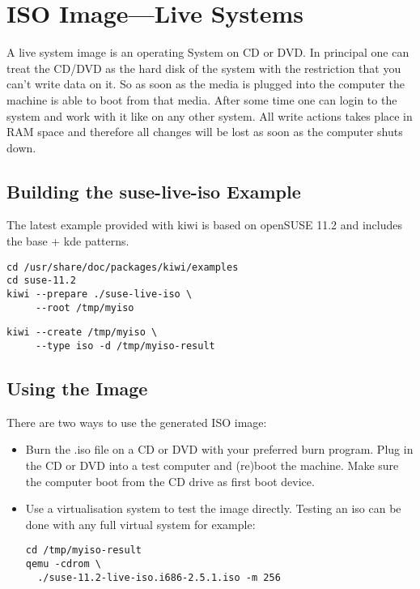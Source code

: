 \chapter{ISO Image---Live Systems}
\label{chapter:iso}
\minitoc

A live system image is an operating System on CD or DVD. In principal
one can treat the CD/DVD as the hard disk of the system with the
restriction that you can't write data on it. So as soon as the media
is plugged into the computer the machine is able to boot from that
media. After some time one can login to the system and work with it
like on any other system. All write actions takes place in RAM space
and therefore all changes will be lost as soon as the computer shuts
down.

\section{Building the suse-live-iso Example}

The latest example provided with kiwi is based on openSUSE 11.2 and
includes the base + kde patterns.

\begin{Command}{12cm}
\begin{verbatim}
cd /usr/share/doc/packages/kiwi/examples
cd suse-11.2
kiwi --prepare ./suse-live-iso \
     --root /tmp/myiso
\end{verbatim}
\end{Command}

\begin{Command}{12cm}
\begin{verbatim}
kiwi --create /tmp/myiso \
     --type iso -d /tmp/myiso-result
\end{verbatim}
\end{Command}

\section{Using the Image}

There are two ways to use the generated ISO image:
\begin{itemize}
\item Burn the .iso file on a CD or DVD with your preferred burn program.
      Plug in the CD or DVD into a test computer and (re)boot the machine.
      Make sure the computer boot from the CD drive as first boot device.
\item Use a virtualisation system to test the image directly. Testing an
      iso can be done with any full virtual system for example:

      \begin{Command}{12cm}
      \begin{verbatim}
cd /tmp/myiso-result
qemu -cdrom \
  ./suse-11.2-live-iso.i686-2.5.1.iso -m 256
      \end{verbatim}
      \end{Command}
\end{itemize}

